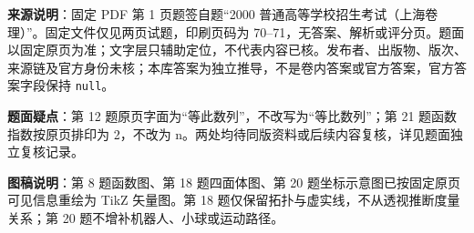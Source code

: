 

\begin{gktip}
\textbf{来源说明}：固定 PDF 第 1 页题签自题“2000 普通高等学校招生考试（上海卷理）”。固定文件仅见两页试题，印刷页码为 70–71，无答案、解析或评分页。题面以固定原页为准；文字层只辅助定位，不代表内容已核。发布者、出版物、版次、来源链及官方身份未核；本库答案为独立推导，不是卷内答案或官方答案，官方答案字段保持 \texttt{null}。

\textbf{题面疑点}：第 12 题原页字面为“等此数列”，不改写为“等比数列”；第 21 题函数指数按原页排印为 2，不改为 n。两处均待同版资料或后续内容复核，详见题面独立复核记录。

\textbf{图稿说明}：第 8 题函数图、第 18 题四面体图、第 20 题坐标示意图已按固定原页可见信息重绘为 TikZ 矢量图。第 18 题仅保留拓扑与虚实线，不从透视推断度量关系；第 20 题不增补机器人、小球或运动路径。
\end{gktip}


